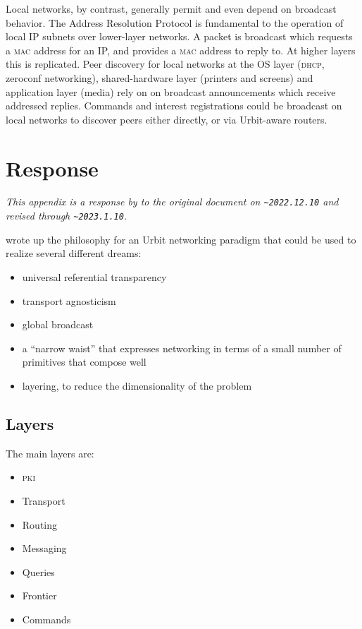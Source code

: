 \documentclass[twoside]{article}
\begin{document}
Local networks, by contrast, generally permit and even depend on broadcast behavior. The Address Resolution Protocol is fundamental to the operation of local IP subnets over lower-layer networks. A packet is broadcast which requests a \textsc{mac} address for an IP, and provides a \textsc{mac} address to reply to. At higher layers this is replicated. Peer discovery for local networks at the OS layer (\textsc{dhcp}, zeroconf networking), shared-hardware layer (printers and screens) and application layer (media) rely on on broadcast announcements which receive addressed replies. Commands and interest registrations could be broadcast on local networks to discover peers either directly, or via Urbit-aware routers.

\section{Response}

\emph{This appendix is a response by  to the original document on \texttt{\textasciitilde 2022.12.10} and revised through \texttt{\textasciitilde 2023.1.10}.}

 wrote up the philosophy for an Urbit networking paradigm that could be used to realize several different dreams:

\begin{itemize}
  \item  universal referential transparency
  \item  transport agnosticism
  \item  global broadcast
  \item  a ``narrow waist'' that expresses networking in terms of a small number of primitives that compose well
  \item  layering, to reduce the dimensionality of the problem
\end{itemize}

\subsection{Layers}

The main layers are:

\begin{itemize}
  \item  \textsc{pki}
  \item  Transport
  \item  Routing
  \item  Messaging
  \item  Queries
  \item  Frontier
  \item  Commands
\end{itemize}
\end{document}

